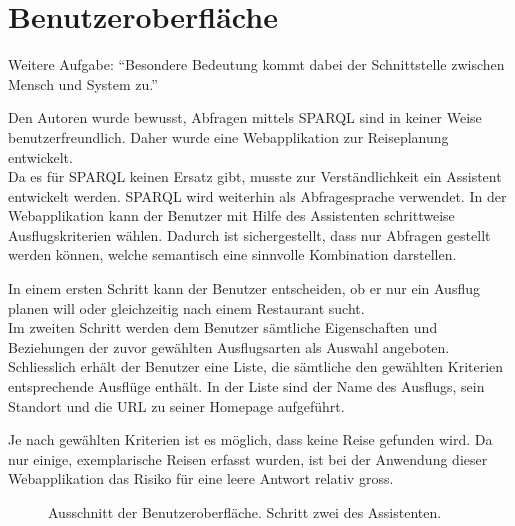 \section{Benutzeroberfläche}
\label{sec:loesung_gui}
Weitere Aufgabe: ``Besondere Bedeutung kommt dabei der Schnittstelle zwischen Mensch und System zu.''~\cite{Aufgabenstellung}

Den Autoren wurde bewusst, Abfragen mittels SPARQL sind in keiner Weise benutzerfreundlich. Daher wurde eine Webapplikation zur Reiseplanung entwickelt.\\
Da es für SPARQL keinen Ersatz gibt, musste zur Verständlichkeit ein Assistent entwickelt werden. SPARQL wird weiterhin als Abfragesprache verwendet. 
In der Webapplikation kann der Benutzer mit Hilfe des Assistenten schrittweise Ausflugskriterien wählen. Dadurch ist sichergestellt, dass nur Abfragen gestellt werden können, welche semantisch eine sinnvolle Kombination darstellen.

In einem ersten Schritt kann der Benutzer entscheiden, ob er nur ein Ausflug planen will oder gleichzeitig nach einem Restaurant sucht.\\
Im zweiten Schritt werden dem Benutzer sämtliche Eigenschaften und Beziehungen der zuvor gewählten Ausflugsarten als Auswahl angeboten.\\
Schliesslich erhält der Benutzer eine Liste, die sämtliche den gewählten Kriterien entsprechende Ausflüge enthält. In der Liste sind der Name des Ausflugs, sein Standort und die URL zu seiner Homepage aufgeführt.

Je nach gewählten Kriterien ist es möglich, dass keine Reise gefunden wird. Da nur einige, exemplarische Reisen erfasst wurden, ist bei der Anwendung dieser Webapplikation das Risiko für eine leere Antwort relativ gross.
\begin{figure}[H]
\centering {}
\caption{Ausschnitt der Benutzeroberfläche. Schritt zwei des Assistenten.\label{fig:gui}\protect\footnotemark}
\end{figure}
